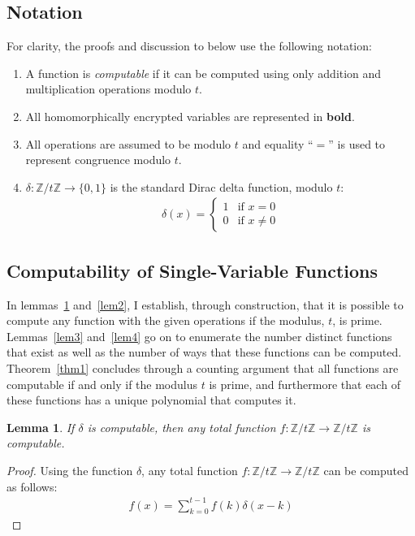 \documentclass{article}
\def\zt{\mathbb{Z}/t\mathbb{Z}}
\newtheorem{lem}{Lemma}
\begin{document}
    \subsection{Notation}
    \label{notation}
        For clarity, the proofs and discussion to below use the following notation:
        \begin{enumerate}[-]
            \item
                A function is \emph{computable} if it can be computed using only addition and multiplication operations modulo $t$.
            \item
                All homomorphically encrypted variables are represented in \textbf{bold}.
            \item
                All operations are assumed to be modulo $t$ and equality ``$=$'' is used to represent congruence modulo $t$.
            \item
                $\delta: \zt\to\{0,1\}$ is the standard Dirac delta function, modulo $t$:
                \begin{align}
                    \delta(x) =
                    \left\{
                        \begin{array}{cc}
                            1 & \text{if } x = 0\\
                            0 & \text{if } x \neq 0
                        \end{array}
                    \right.
                \end{align}
        \end{enumerate}

    \subsection{Computability of Single-Variable Functions}
    \label{comp}
    In lemmas~\ref{lem1} and~\ref{lem2}, I establish, through construction, that it is possible to compute any function with the given operations if the modulus, $t$, is prime.
    Lemmas~\ref{lem3} and~\ref{lem4} go on to enumerate the number distinct functions that exist as well as the number of ways that these functions can be computed.
    Theorem~\ref{thm1} concludes through a counting argument that all functions are computable if and only if the modulus $t$ is prime,
    and furthermore that each of these functions has a unique polynomial that computes it.

    \begin{lem}
      \label{lem1}
        If $\delta$ is computable, then any total function 
        $f:\zt\to\zt$ is computable.
    \end{lem}
    \begin{proof}
        Using the function $\delta$, any total function $f:\zt\to\zt$ can be computed as follows:
        \begin{align}
            f(x) = \sum_{k = 0}^{t-1} f(k)\delta(x - k)
        \end{align}
    \end{proof}
    
\end{document}
